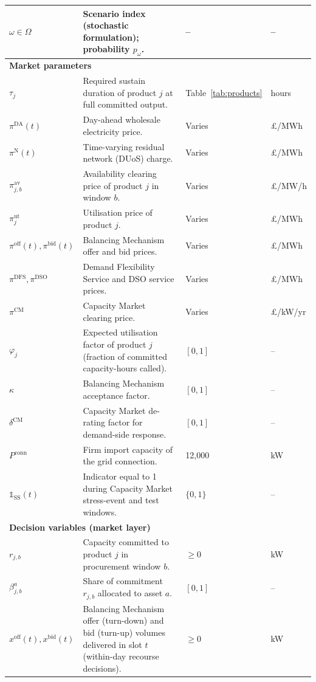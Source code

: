 \documentclass[lettersize,journal]{IEEEtran}
\begin{document}
{{\begin{longtable}{p{} p{} p{} p{}}
$\omega \in \Omega$ & Scenario index (stochastic formulation); probability $p_\omega$. & -- & -- \\
\midrule
\multicolumn{4}{l}{\textbf{Market parameters}} \\
\midrule
$\tau_j$ & Required sustain duration of product $j$ at full committed output. & Table~\ref{tab:products} & hours \\
$\pi^{\mathrm{DA}}(t)$ & Day-ahead wholesale electricity price. & Varies & \pounds/MWh \\
$\pi^{\mathrm{N}}(t)$ & Time-varying residual network (DUoS) charge. & Varies & \pounds/MWh \\
$\pi^{\mathrm{av}}_{j,b}$ & Availability clearing price of product $j$ in window $b$. & Varies & \pounds/MW/h \\
$\pi^{\mathrm{ut}}_{j}$ & Utilisation price of product $j$. & Varies & \pounds/MWh \\
$\pi^{\mathrm{off}}(t), \pi^{\mathrm{bid}}(t)$ & Balancing Mechanism offer and bid prices. & Varies & \pounds/MWh \\
$\pi^{\mathrm{DFS}}, \pi^{\mathrm{DSO}}$ & Demand Flexibility Service and DSO service prices. & Varies & \pounds/MWh \\
$\pi^{\mathrm{CM}}$ & Capacity Market clearing price. & Varies & \pounds/kW/yr \\
$\varphi_j$ & Expected utilisation factor of product $j$ (fraction of committed capacity-hours called). & $[0,1]$ & -- \\
$\kappa$ & Balancing Mechanism acceptance factor. & $[0,1]$ & -- \\
$\delta^{\mathrm{CM}}$ & Capacity Market de-rating factor for demand-side response. & $[0,1]$ & -- \\
$P^{\mathrm{conn}}$ & Firm import capacity of the grid connection. & 12{,}000 & kW \\
$\mathbb{1}_{\mathrm{SS}}(t)$ & Indicator equal to 1 during Capacity Market stress-event and test windows. & $\{0,1\}$ & -- \\
\midrule
\multicolumn{4}{l}{\textbf{Decision variables (market layer)}} \\
\midrule
$r_{j,b}$ & Capacity committed to product $j$ in procurement window $b$. & $\geq 0$ & kW \\
$\beta^{a}_{j,b}$ & Share of commitment $r_{j,b}$ allocated to asset $a$. & $[0,1]$ & -- \\
$x^{\mathrm{off}}(t), x^{\mathrm{bid}}(t)$ & Balancing Mechanism offer (turn-down) and bid (turn-up) volumes delivered in slot $t$ (within-day recourse decisions). & $\geq 0$ & kW \\

\end{longtable}}}
\end{document}
